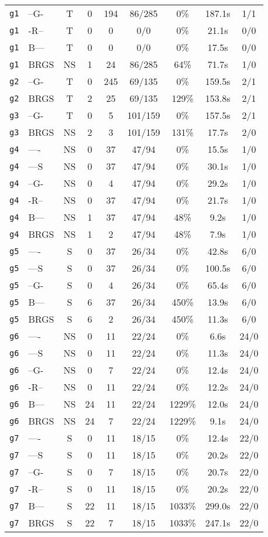 \begin{tabular}{llccccccc}
\texttt{g1} & --G- & T & 0 & 194 & 86/285 & 0\% & 187.1s & 1/1 \\
\texttt{g1} & -R-- & T & 0 & 0 & 0/0 & 0\% & 21.1s & 0/0 \\
\texttt{g1} & B--- & T & 0 & 0 & 0/0 & 0\% & 17.5s & 0/0 \\
\texttt{g1} & BRGS & NS & 1 & 24 & 86/285 & 64\% & 71.7s & 1/0 \\
\texttt{g2} & --G- & T & 0 & 245 & 69/135 & 0\% & 159.5s & 2/1 \\
\texttt{g2} & BRGS & T & 2 & 25 & 69/135 & 129\% & 153.8s & 2/1 \\
\texttt{g3} & --G- & T & 0 & 5 & 101/159 & 0\% & 157.5s & 2/1 \\
\texttt{g3} & BRGS & NS & 2 & 3 & 101/159 & 131\% & 17.7s & 2/0 \\
\texttt{g4} & ---- & NS & 0 & 37 & 47/94 & 0\% & 15.5s & 1/0 \\
\texttt{g4} & ---S & NS & 0 & 37 & 47/94 & 0\% & 30.1s & 1/0 \\
\texttt{g4} & --G- & NS & 0 & 4 & 47/94 & 0\% & 29.2s & 1/0 \\
\texttt{g4} & -R-- & NS & 0 & 37 & 47/94 & 0\% & 21.7s & 1/0 \\
\texttt{g4} & B--- & NS & 1 & 37 & 47/94 & 48\% & 9.2s & 1/0 \\
\texttt{g4} & BRGS & NS & 1 & 2 & 47/94 & 48\% & 7.9s & 1/0 \\
\texttt{g5} & ---- & S & 0 & 37 & 26/34 & 0\% & 42.8s & 6/0 \\
\texttt{g5} & ---S & S & 0 & 37 & 26/34 & 0\% & 100.5s & 6/0 \\
\texttt{g5} & --G- & S & 0 & 4 & 26/34 & 0\% & 65.4s & 6/0 \\
\texttt{g5} & B--- & S & 6 & 37 & 26/34 & 450\% & 13.9s & 6/0 \\
\texttt{g5} & BRGS & S & 6 & 2 & 26/34 & 450\% & 11.3s & 6/0 \\
\texttt{g6} & ---- & NS & 0 & 11 & 22/24 & 0\% & 6.6s & 24/0 \\
\texttt{g6} & ---S & NS & 0 & 11 & 22/24 & 0\% & 11.3s & 24/0 \\
\texttt{g6} & --G- & NS & 0 & 7 & 22/24 & 0\% & 12.4s & 24/0 \\
\texttt{g6} & -R-- & NS & 0 & 11 & 22/24 & 0\% & 12.2s & 24/0 \\
\texttt{g6} & B--- & NS & 24 & 11 & 22/24 & 1229\% & 12.0s & 24/0 \\
\texttt{g6} & BRGS & NS & 24 & 7 & 22/24 & 1229\% & 9.1s & 24/0 \\
\texttt{g7} & ---- & S & 0 & 11 & 18/15 & 0\% & 12.4s & 22/0 \\
\texttt{g7} & ---S & S & 0 & 11 & 18/15 & 0\% & 20.2s & 22/0 \\
\texttt{g7} & --G- & S & 0 & 7 & 18/15 & 0\% & 20.7s & 22/0 \\
\texttt{g7} & -R-- & S & 0 & 11 & 18/15 & 0\% & 20.2s & 22/0 \\
\texttt{g7} & B--- & S & 22 & 11 & 18/15 & 1033\% & 299.0s & 22/0 \\
\texttt{g7} & BRGS & S & 22 & 7 & 18/15 & 1033\% & 247.1s & 22/0 \\
\bottomrule
\end{tabular}

